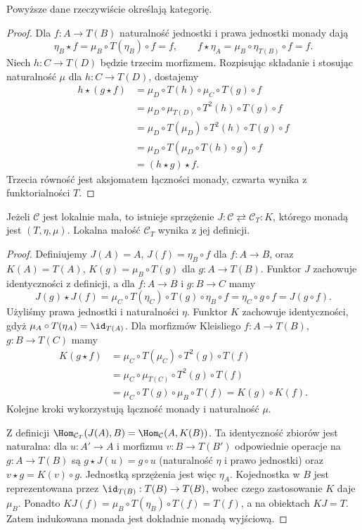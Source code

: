\begin{stwierdzenie}
Powyższe dane rzeczywiście określają kategorię.
\end{stwierdzenie}
\begin{proof}
Dla $f:A\to T(B)$ naturalność jednostki i prawa jednostki monady dają
\[
\eta_B\star f=\mu_B\circ T(\eta_B)\circ f=f,
\qquad
f\star\eta_A=\mu_B\circ\eta_{T(B)}\circ f=f.
\]
Niech $h:C\to T(D)$ będzie trzecim morfizmem. Rozpisując składanie i stosując naturalność $\mu$ dla $h:C\to T(D)$, dostajemy
\[
\begin{aligned}
h\star(g\star f)
&=\mu_D\circ T(h)\circ\mu_C\circ T(g)\circ f\\
&=\mu_D\circ\mu_{T(D)}\circ T^2(h)\circ T(g)\circ f\\
&=\mu_D\circ T(\mu_D)\circ T^2(h)\circ T(g)\circ f\\
&=\mu_D\circ T(\mu_D\circ T(h)\circ g)\circ f\\
&=(h\star g)\star f.
\end{aligned}
\]
Trzecia równość jest aksjomatem łączności monady, czwarta wynika z funktorialności $T$.
\end{proof}

\begin{stwierdzenie}\label{cat:prop:kleisli-adj}
Jeżeli $\mathcal C$ jest lokalnie mała, to istnieje sprzężenie $J:\mathcal C\rightleftarrows\mathcal C_T:K$, którego monadą jest $(T,\eta,\mu)$. Lokalna małość $\mathcal C_T$ wynika z jej definicji.
\end{stwierdzenie}
\begin{proof}
Definiujemy $J(A)=A$, $J(f)=\eta_B\circ f$ dla $f:A\to B$, oraz $K(A)=T(A)$, $K(g)=\mu_B\circ T(g)$ dla $g:A\to T(B)$. Funktor $J$ zachowuje identyczności z definicji, a dla $f:A\to B$ i $g:B\to C$ mamy
\[
J(g)\star J(f)
=\mu_C\circ T(\eta_C)\circ T(g)\circ\eta_B\circ f
=\eta_C\circ g\circ f=J(g\circ f).
\]
Użyliśmy prawa jednostki i naturalności $\eta$. Funktor $K$ zachowuje identyczności, gdyż $\mu_A\circ T(\eta_A)=\id_{T(A)}$. Dla morfizmów Kleisliego $f:A\to T(B)$, $g:B\to T(C)$ mamy
\[
\begin{aligned}
K(g\star f)&=\mu_C\circ T(\mu_C)\circ T^2(g)\circ T(f)\\
&=\mu_C\circ\mu_{T(C)}\circ T^2(g)\circ T(f)\\
&=\mu_C\circ T(g)\circ\mu_B\circ T(f)=K(g)\circ K(f).
\end{aligned}
\]
Kolejne kroki wykorzystują łączność monady i naturalność $\mu$.

Z definicji $\Hom_{\mathcal C_T}(J(A),B)=\Hom_{\mathcal C}(A,K(B))$. Ta identyczność zbiorów jest naturalna: dla $u:A'\to A$ i morfizmu $v:B\to T(B')$ odpowiednie operacje na $g:A\to T(B)$ są $g\star J(u)=g\circ u$ (naturalność $\eta$ i prawo jednostki) oraz $v\star g=K(v)\circ g$. Jednostką sprzężenia jest więc $\eta_A$. Kojednostka w $B$ jest reprezentowana przez $\id_{T(B)}:T(B)\to T(B)$, wobec czego zastosowanie $K$ daje $\mu_B$. Ponadto $KJ(f)=\mu_B\circ T(\eta_B)\circ T(f)=T(f)$, a na obiektach $KJ=T$. Zatem indukowana monada jest dokładnie monadą wyjściową.
\end{proof}

